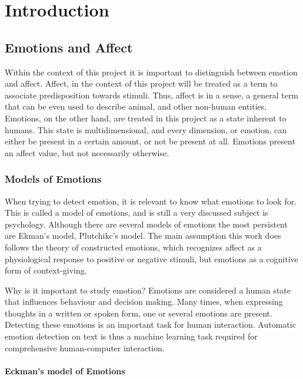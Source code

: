 \chapter{Introduction}
\label{chap:Introduction}

\section{Emotions and Affect}
\label{sec:Emotions and Affect}

Within the context of this project it is important to distinguish between emotion and affect. Affect, in the context of this project will be treated as a term to associate predisposition towards stimuli. Thus, affect is in a sense, a general term that can be even used to describe animal, and other non-human entities. Emotions, on the other hand, are treated in this project as a state inherent to humans. This state is multidimensional, and every dimension, or emotion, can either be present in a certain amount, or not be present at all.
Emotions present an affect value, but not necessarily otherwise.

\subsection{Models of Emotions}
\label{sub:Models of Emotions}

When trying to detect emotion, it is relevant to know what emotions to look for. This is called a model of emotions, and is still a very discussed subject is psychology. Although there are several models of emotions the most persistent are Ekman’s model, Plutchikc’s model. The main assumption this work does follows the theory of constructed emotions, which recognizes affect as a physiological response to positive or negative stimuli, but emotions as a cognitive form of context-giving.

Why is it important to study emotion?
Emotions are considered a human state that influences behaviour and decision making. Many times, when expressing thoughts in a written or spoken form, one or several emotions are present. Detecting these emotions is an important task for human interaction. Automatic emotion detection on text is thus a machine learning task required for comprehensive human-computer interaction.

\subsubsection{Eckman's model of Emotions}
\label{subs:Eckman's model of Emotions}

